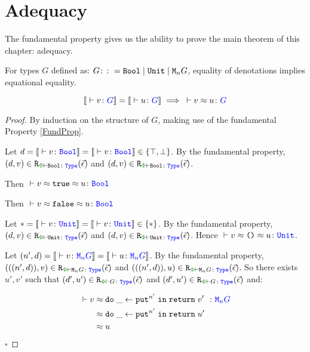 \section{Adequacy}
\label{AdequacySection}

The fundamental property gives us the ability to prove the main theorem of this chapter: adequacy.

\begin{framed}
    
    \begin{theorem}[Adequacy]
        For types $G$ defined as: $ G\colon\colon= \texttt{Bool} \mid \texttt{Unit} \mid \texttt{M}_{n}{G}$, equality of denotations implies equational equality.
        
        \begin{equation}
            \deno{\ztyperelation{v}{G}} = \deno{\ztyperelation{u}{G}} \implies \zberelation{v}{u}{G}
        \end{equation}
        
    \end{theorem}
        
        \begin{proof}
            By induction on the structure of $G$, making use of the fundamental Property \ref{FundProp}.
        

            Let $d=\deno{\ztyperelation{v}{\B}}=\deno{\ztyperelation{v}{\B}}\in \{ \top, \bot\}$. By the fundamental property, $\inLogRelPE{d}{v}{\B}$  and $\inLogRelPE{d}{v}{\B}$.
        
            Then $\zberelation{v\beequiv\t}{u}{\B}$
        
            
            Then $\zberelation{v\beequiv\f}{u}{\B}$
        

            Let $\singleton=\deno{\ztyperelation{v}{\U}}=\deno{\ztyperelation{v}{\U}}\in \{\singleton\}$. By the fundamental property, $\inLogRelPE{d}{v}{\U}$  and $\inLogRelPE{d}{v}{\U}$. Hence $\zberelation{v\beequiv\u}{u}{\U}$.
        
            \case{\teffect}
        
            Let $( n',  d) = \deno{\ztyperelation{v}{\M{n}{G}}} = \deno{\ztyperelation{u}{\M{n}{G}}}$. By the fundamental property, $\inLogRelPE{((n', d))}{v}{\M{n}{G}}$ and $\inLogRelPE{((n', d))}{u}{\M{n}{G}}$. So there exists $u', v'$ such that $\inLogRelPE{d'}{u'}{G}$ and $\inLogRelPE{d'}{u'}{G}$ and:
        
            \begin{align*}
                \zberelation{v&}{\doin{\_}{\put^{n'}}{\return{v'}}}{\M{n}{G}}\\
                &\beequiv \doin{\_}{\put^{n'}}{\return{u'}}\\
                & \beequiv u
            \end{align*}
        $\square$
        \end{proof}
\end{framed}


